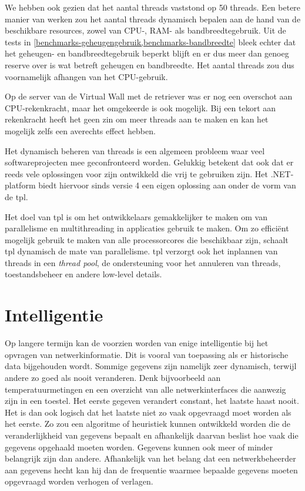 We hebben ook gezien dat het aantal threads vaststond op 50 threads.
Een betere manier van werken zou het aantal threads dynamisch bepalen aan de hand van de beschikbare resources, zowel van CPU-, RAM- als bandbreedtegebruik.
Uit de tests in \cref{benchmarks-geheugengebruik,benchmarks-bandbreedte} bleek echter dat het geheugen- en bandbreedtegebruik beperkt blijft
en er dus meer dan genoeg reserve over is wat betreft geheugen en bandbreedte.
Het aantal threads zou dus voornamelijk afhangen van het CPU-gebruik.

Op de server van de Virtual Wall met de retriever was er nog een overschot aan CPU-rekenkracht,
maar het omgekeerde is ook mogelijk.
Bij een tekort aan rekenkracht heeft het geen zin om meer threads aan te maken en kan het mogelijk zelfs een averechts effect hebben.

Het dynamisch beheren van threads is een algemeen probleem waar veel softwareprojecten mee geconfronteerd worden.
Gelukkig betekent dat ook dat er reeds vele oplossingen voor zijn ontwikkeld die vrij te gebruiken zijn.
Het .NET-platform biedt hiervoor sinds versie 4 een eigen oplossing aan onder de vorm van de \gls{tpl}.

Het doel van \gls{tpl} is om het ontwikkelaars gemakkelijker te maken om van parallelisme en multithreading in applicaties gebruik te maken.
Om zo efficiënt mogelijk gebruik te maken van alle processorcores die beschikbaar zijn, schaalt \gls{tpl} dynamisch de mate van parallelisme.
\Gls{tpl} verzorgt ook het inplannen van threads in een \textit{thread pool}, de ondersteuning voor het annuleren van threads, toestandsbeheer en
andere low-level details\cite{msdn-tpl}.


\section{Intelligentie}

Op langere termijn kan de \nwmretriever{} voorzien worden van enige intelligentie bij het opvragen van netwerkinformatie.
Dit is vooral van toepassing als er historische data bijgehouden wordt.
Sommige gegevens zijn namelijk zeer dynamisch, terwijl andere zo goed als nooit veranderen.
Denk bijvoorbeeld aan temperatuurmetingen en een overzicht van alle netwerkinterfaces die aanwezig zijn in een toestel.
Het eerste gegeven verandert constant, het laatste haast nooit.
Het is dan ook logisch dat het laatste niet zo vaak opgevraagd moet worden als het eerste.
Zo zou een algoritme of heuristiek kunnen ontwikkeld worden die de veranderlijkheid van gegevens bepaalt en afhankelijk daarvan
beslist hoe vaak die gegevens opgehaald moeten worden.
Gegevens kunnen ook meer of minder belangrijk zijn dan andere.
Afhankelijk van het belang dat een netwerkbeheerder aan gegevens hecht kan hij dan de frequentie waarmee bepaalde gegevens moeten opgevraagd worden verhogen of verlagen.



